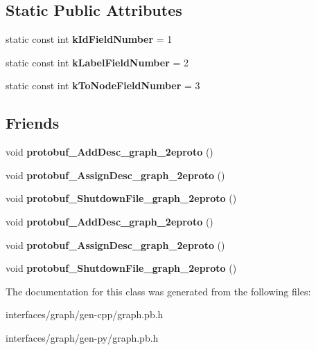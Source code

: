 \subsection*{Static Public Attributes}
\begin{DoxyCompactItemize}
\item 
\hypertarget{classgraph_1_1Graph__Edge_a72855929893523a2ab0b28c29e6de404}{
static const int {\bfseries kIdFieldNumber} = 1}
\label{classgraph_1_1Graph__Edge_a72855929893523a2ab0b28c29e6de404}

\item 
\hypertarget{classgraph_1_1Graph__Edge_a6a3f7f24e4560ba96be0534f45781197}{
static const int {\bfseries kLabelFieldNumber} = 2}
\label{classgraph_1_1Graph__Edge_a6a3f7f24e4560ba96be0534f45781197}

\item 
\hypertarget{classgraph_1_1Graph__Edge_a15d36a93bd22e587021c53b7b3e16e84}{
static const int {\bfseries kToNodeFieldNumber} = 3}
\label{classgraph_1_1Graph__Edge_a15d36a93bd22e587021c53b7b3e16e84}

\end{DoxyCompactItemize}
\subsection*{Friends}
\begin{DoxyCompactItemize}
\item 
\hypertarget{classgraph_1_1Graph__Edge_a3216c708da10839178deebea43d6f0be}{
void {\bfseries protobuf\_\-AddDesc\_\-graph\_\-2eproto} ()}
\label{classgraph_1_1Graph__Edge_a3216c708da10839178deebea43d6f0be}

\item 
\hypertarget{classgraph_1_1Graph__Edge_a4c9d7eb8f9e30e490c8bcae70e629de5}{
void {\bfseries protobuf\_\-AssignDesc\_\-graph\_\-2eproto} ()}
\label{classgraph_1_1Graph__Edge_a4c9d7eb8f9e30e490c8bcae70e629de5}

\item 
\hypertarget{classgraph_1_1Graph__Edge_aac10332314561225d8ac09b797223f3d}{
void {\bfseries protobuf\_\-ShutdownFile\_\-graph\_\-2eproto} ()}
\label{classgraph_1_1Graph__Edge_aac10332314561225d8ac09b797223f3d}

\item 
\hypertarget{classgraph_1_1Graph__Edge_a3216c708da10839178deebea43d6f0be}{
void {\bfseries protobuf\_\-AddDesc\_\-graph\_\-2eproto} ()}
\label{classgraph_1_1Graph__Edge_a3216c708da10839178deebea43d6f0be}

\item 
\hypertarget{classgraph_1_1Graph__Edge_a4c9d7eb8f9e30e490c8bcae70e629de5}{
void {\bfseries protobuf\_\-AssignDesc\_\-graph\_\-2eproto} ()}
\label{classgraph_1_1Graph__Edge_a4c9d7eb8f9e30e490c8bcae70e629de5}

\item 
\hypertarget{classgraph_1_1Graph__Edge_aac10332314561225d8ac09b797223f3d}{
void {\bfseries protobuf\_\-ShutdownFile\_\-graph\_\-2eproto} ()}
\label{classgraph_1_1Graph__Edge_aac10332314561225d8ac09b797223f3d}

\end{DoxyCompactItemize}


The documentation for this class was generated from the following files:\begin{DoxyCompactItemize}
\item 
interfaces/graph/gen-\/cpp/graph.pb.h\item 
interfaces/graph/gen-\/py/graph.pb.h\end{DoxyCompactItemize}
